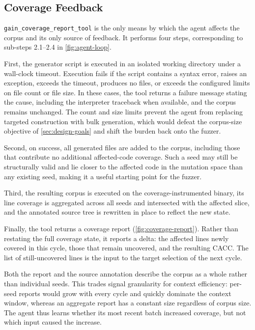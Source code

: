 \subsection{Coverage Feedback}
\label{sec:agent-feedback}

\texttt{gain\_coverage\_report\_tool} is the only means by which the agent affects the corpus and its only source of feedback.
It performs four steps, corresponding to sub-steps 2.1--2.4 in \cref{fig:agent-loop}.

First, the generator script is executed in an isolated working directory under a wall-clock timeout.
Execution fails if the script contains a syntax error, raises an exception, exceeds the timeout, produces no files, or exceeds the configured limits on file count or file size.
In these cases, the tool returns a failure message stating the cause, including the interpreter traceback when available, and the corpus remains unchanged.
The count and size limits prevent the agent from replacing targeted construction with bulk generation, which would defeat the corpus-size objective of \cref{sec:design-goals} and shift the burden back onto the fuzzer.

Second, on success, all generated files are added to the corpus, including those that contribute no additional affected-code coverage.
Such a seed may still be structurally valid and lie closer to the affected code in the mutation space than any existing seed, making it a useful starting point for the fuzzer.

Third, the resulting corpus is executed on the coverage-instrumented binary, its line coverage is aggregated across all seeds and intersected with the affected slice, and the annotated source tree is rewritten in place to reflect the new state.

Finally, the tool returns a coverage report (\cref{fig:coverage-report}).
Rather than restating the full coverage state, it reports a delta: the affected lines newly covered in this cycle, those that remain uncovered, and the resulting \ac{CACC}.
The list of still-uncovered lines is the input to the target selection of the next cycle.



Both the report and the source annotation describe the corpus as a whole rather than individual seeds.
This trades signal granularity for context efficiency: per-seed reports would grow with every cycle and quickly dominate the context window, whereas an aggregate report has a constant size regardless of corpus size.
The agent thus learns whether its most recent batch increased coverage, but not which input caused the increase.